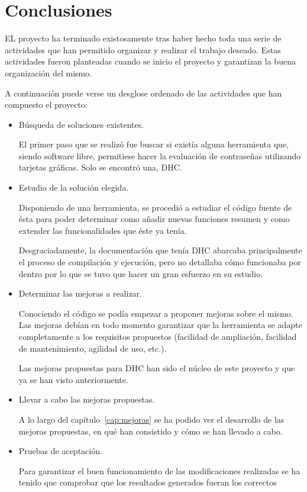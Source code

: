 \chapter{Conclusiones}

EL proyecto ha terminado existosamente tras haber hecho toda una serie de actividades que han permitido organizar y realizar el trabajo deseado. Estas actividades fueron planteadas cuando se inicio el proyecto y garantizan la buena organización del mismo.

A continuación puede verse un desglose ordenado de las actividades que han compuesto el proyecto:

\begin{itemize}
	\item Búsqueda de soluciones existentes.

		El primer paso que se realizó fue buscar si existía alguna herramienta que, siendo software libre, permitiese hacer la evaluación de contraseñas utilizando tarjetas gráficas. Solo se encontró una, DHC.

	\item Estudio de la solución elegida.

		Disponiendo de una herramienta, se procedió a estudiar el código fuente de ésta para poder determinar como añadir nuevas funciones resumen y como extender las funcionalidades que éste ya tenía.

		Desgraciadamente, la documentación que tenía DHC abarcaba principalmente el proceso de compilación y ejecución, pero no detallaba cómo funcionaba por dentro por lo que se tuvo que hacer un gran esfuerzo en su estudio.

	\item Determinar las mejoras a realizar.

		Conociendo el código se podía empezar a proponer mejoras sobre el mismo. Las mejoras debían en todo momento garantizar que la herramienta se adapte completamente a los requisitos propuestos (facilidad de ampliación, facilidad de mantenimiento, agilidad de uso, etc.).

		Las mejoras propuestas para DHC han sido el núcleo de este proyecto y que ya se han visto anteriormente.

	\item Llevar a cabo las mejoras propuestas.

		A lo largo del capítulo~\ref{cap:mejoras} se ha podido ver el desarrollo de las mejoras propuestas, en qué han consistido y cómo se han llevado a cabo.

	\item Pruebas de aceptación.

		Para garantizar el buen funcionamiento de las modificaciones realizadas se ha tenido que comprobar que los resultados generados fueran los correctos
\end{itemize}




